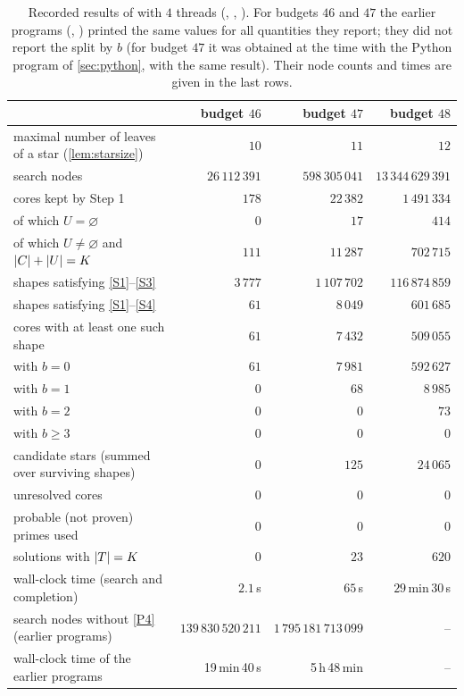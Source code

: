 \documentclass[11pt]{article}
\begin{document}
\begin{table}[t]
\centering
\caption{Recorded results of \protect{} with $4$ threads (\protect{}, \protect{}, \protect{}). For budgets $46$ and $47$ the earlier programs (\protect{}, \protect{}) printed the same values for all quantities they report; they did not report the split by $b$ (for budget $47$ it was obtained at the time with the Python program of \cref{sec:python}, with the same result). Their node counts and times are given in the last rows.}
\label{tab:results}
\small
\begin{tabular}{@{}lrrr@{}}
\toprule
 & budget $46$ & budget $47$ & budget $48$\\
\midrule
maximal number of leaves of a star (\cref{lem:starsize}) & $10$ & $11$ & $12$\\
search nodes & $26\,112\,391$ & $598\,305\,041$ & $13\,344\,629\,391$\\
cores kept by Step 1 & $178$ & $22\,382$ & $1\,491\,334$\\
\quad of which $U=\varnothing$ & $0$ & $17$ & $414$\\
\quad of which $U\ne\varnothing$ and $\lvert C\rvert+\lvert U\rvert=K$ & $111$ & $11\,287$ & $702\,715$\\
shapes satisfying \ref{S1}--\ref{S3} & $3\,777$ & $1\,107\,702$ & $116\,874\,859$\\
shapes satisfying \ref{S1}--\ref{S4} & $61$ & $8\,049$ & $601\,685$\\
\quad cores with at least one such shape & $61$ & $7\,432$ & $509\,055$\\
\quad with $b=0$ & $61$ & $7\,981$ & $592\,627$\\
\quad with $b=1$ & $0$ & $68$ & $8\,985$\\
\quad with $b=2$ & $0$ & $0$ & $73$\\
\quad with $b\ge3$ & $0$ & $0$ & $0$\\
candidate stars (summed over surviving shapes) & $0$ & $125$ & $24\,065$\\
unresolved cores & $0$ & $0$ & $0$\\
probable (not proven) primes used & $0$ & $0$ & $0$\\
solutions with $\lvert T\rvert=K$ & $0$ & $23$ & $620$\\
wall-clock time (search and completion) & $2.1$\,s & $65$\,s & $29$\,min\,$30$\,s\\
\midrule
search nodes without \ref{P4} (earlier programs) & $139\,830\,520\,211$ & $1\,795\,181\,713\,099$ & --\\
wall-clock time of the earlier programs & 19\,min\,40\,s & 5\,h\,48\,min & --\\
\bottomrule
\end{tabular}
\end{table}
\end{document}
